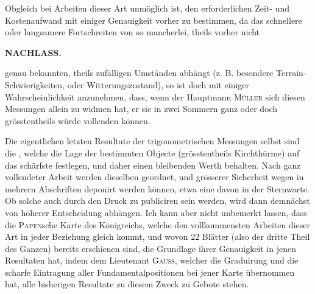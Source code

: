 \par\noindent\hspace*{\parindent}Obgleich bei Arbeiten dieser Art unmöglich ist, den erforderlichen Zeit- und Kostenaufwand mit einiger Genauigkeit vorher zu bestimmen, da das schnellere oder langsamere Fortschreiten von so mancherlei, theils vorher nicht

\par\clearpage
\noindent{}\hfill{\small\textbf{NACHLASS.}}\hfill\null\par\medskip

\noindent genau bekannten, theils zufälligen Umständen abhängt (z. B. besondere Terrain-Schwierigkeiten, oder Witterungszustand), so ist doch mit einiger Wahrscheinlichkeit anzunehmen, dass, wenn der Hauptmann \textsc{Müller} sich diesen Messungen allein zu widmen hat, er sie in zwei Sommern ganz oder doch grösstentheils würde vollenden können.

\par\medskip
\par\noindent\hspace*{\parindent}Die eigentlichen letzten Resultate der trigonometrischen Messungen selbst sind die , welche die Lage der bestimmten Objecte (grösstentheils Kirchthürme) auf das schärfste festlegen, und daher einen bleibenden Werth behalten. Nach ganz vollendeter Arbeit werden dieselben geordnet, und grösserer Sicherheit wegen in mehrern Abschriften deponirt werden können, etwa eine davon in der Sternwarte. Ob solche auch durch den Druck zu publiciren sein werden, wird dann demnächst von höherer Entscheidung abhängen. Ich kann aber nicht unbemerkt lassen, dass die \textsc{Papen}sche Karte des Königreichs, welche den vollkommensten Arbeiten dieser Art in jeder Beziehung gleich kommt, und wovon 22 Blätter (also der dritte Theil des Ganzen) bereits erschienen sind, die Grundlage ihrer Genauigkeit in jenen Resultaten hat, indem dem Lieutenant \textsc{Gauss}, welcher die Graduirung und die scharfe Eintragung aller Fundamentalpositionen bei jener Karte übernommen hat, alle bisherigen Resultate zu diesem Zweck zu Gebote stehen.

